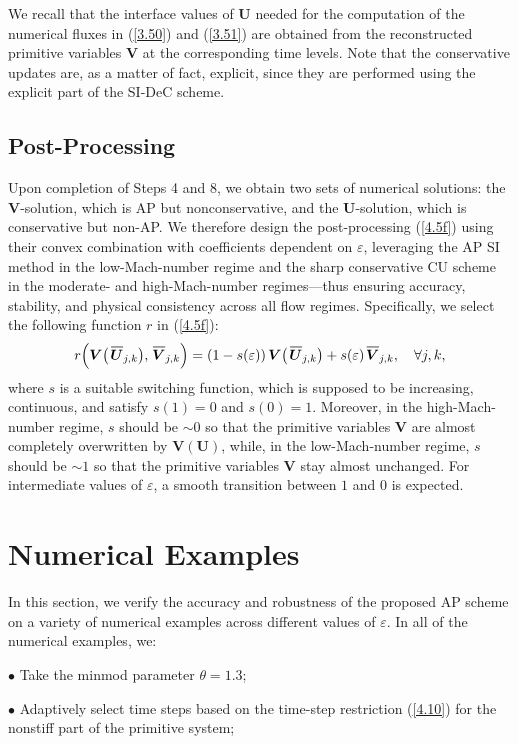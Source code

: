 \documentclass[A4paper,12pt,twoside]{article}
\numberwithin{equation}{section}
\numberwithin{figure}{section}
\numberwithin{table}{section}
\newcommand{\ve}{\varepsilon}
\newcommand\eref[1]{(\ref{#1})}
\newcommand*\xbar[1]{%
  \hbox{%
    \vbox{%
      \hrule height 0.5pt %
      \kern0.4ex%
      \hbox{%
        \kern-0.05em%
        \ensuremath{#1}%
        \kern-0.00em%
      }%
    }%
  }%
}
\begin{document}
We recall that the interface values of $\bm U$ needed for the computation of the numerical fluxes in \eref{3.50} and \eref{3.51} are
obtained from the reconstructed primitive variables $\bm V$ at the corresponding time levels. Note that the conservative updates are, as a
matter of fact, explicit, since they are performed using the explicit part of the SI-DeC scheme.

\subsection{Post-Processing}\label{sec43}
Upon completion of Steps 4 and 8, we obtain two sets of numerical solutions: the $\bm V$-solution, which is AP but nonconservative, and the
$\bm U$-solution, which is conservative but non-AP. We therefore design the post-processing \eref{4.5f} using their convex combination with
coefficients dependent on $\ve$, leveraging the AP SI method in the low-Mach-number regime and the sharp conservative CU scheme in the
moderate- and high-Mach-number regimes---thus ensuring accuracy, stability, and physical consistency across all flow regimes. Specifically,
we select the following function $r$ in \eref{4.5f}:
\begin{equation*}
r\Big(\bm V\big(\,\xbar{\bm U}_{j,k}\big),\,\xbar{\bm V}_{j,k}\Big)=
(1-s(\ve))\,\bm V\big(\,\xbar{\bm U}_{j,k}\big)+s(\ve)\,\xbar{\bm V}_{j,k},\quad\forall j,k,
\end{equation*}
where $s$ is a suitable switching function, which is supposed to be increasing, continuous, and satisfy $s(1)=0$ and $s(0)=1$. Moreover,
in the high-Mach-number regime, $s$ should be $\sim0$ so that the primitive variables $\bm V$ are almost completely overwritten by
$\bm V(\bm U)$, while, in the low-Mach-number regime, $s$ should be $\sim1$ so that the primitive variables $\bm V$ stay almost unchanged.
For intermediate values of $\ve$, a smooth transition between $1$ and $0$ is expected.

\section{Numerical Examples}\label{sec6}
In this section, we verify the accuracy and robustness of the proposed AP scheme on a variety of numerical examples across different values 
of $\ve$. In all of the numerical examples, we:

\smallskip
\noindent
$\bullet$ Take the minmod parameter $\theta=1.3$;

\smallskip
\noindent
$\bullet$ Adaptively select time steps based on the time-step restriction \eref{4.10} for the nonstiff part of the primitive system;
\end{document}
